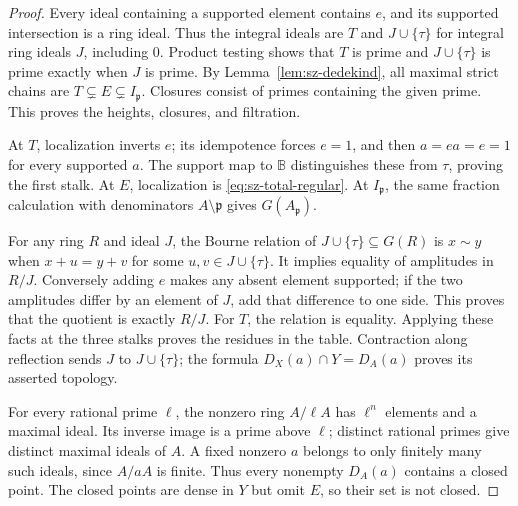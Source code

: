 \documentclass[11pt,a4paper]{article}
\theoremstyle{definition}\newtheorem{definition}[theorem]{Definition}
\begin{document}
\begin{proof}
Every ideal containing a supported element contains \(e\), and its
supported intersection is a ring ideal. Thus the integral ideals
are \(T\) and \(J\cup\{\tau\}\) for integral ring ideals \(J\), including
\(0\). Product testing shows that \(T\) is prime and
\(J\cup\{\tau\}\) is prime exactly when \(J\) is prime.
By Lemma~\ref{lem:sz-dedekind}, all maximal strict chains are
\(T\subsetneq E\subsetneq I_{\mathfrak p}\).
Closures consist of primes containing the given prime. This proves
the heights, closures, and filtration.

At \(T\), localization inverts \(e\); its idempotence forces \(e=1\),
and then \(a=ea=e=1\) for every supported \(a\). The support map to
\(\mathbb B\) distinguishes these from \(\tau\), proving the first
stalk. At \(E\), localization is \eqref{eq:sz-total-regular}.
At \(I_{\mathfrak p}\), the same fraction calculation with
denominators \(A\setminus\mathfrak p\) gives \(G(A_{\mathfrak p})\).

For any ring \(R\) and ideal \(J\), the Bourne relation of
\(J\cup\{\tau\}\subseteq G(R)\) is
\(x\sim y\) when \(x+u=y+v\) for some \(u,v\in J\cup\{\tau\}\).
It implies equality of amplitudes in \(R/J\).
Conversely adding \(e\) makes any absent element supported; if the
two amplitudes differ by an element of \(J\), add that difference
to one side. This proves that the quotient is exactly \(R/J\).
For \(T\), the relation is equality. Applying these facts at the
three stalks proves the residues in the table.
Contraction along reflection sends \(J\) to \(J\cup\{\tau\}\);
the formula \(D_X(a)\cap Y=D_A(a)\) proves its asserted topology.

For every rational prime \(\ell\), the nonzero ring \(A/\ell A\)
has \(\ell^n\) elements and a maximal ideal. Its inverse image is
a prime above \(\ell\); distinct rational primes give distinct
maximal ideals of \(A\). A fixed nonzero \(a\) belongs to only
finitely many such ideals, since \(A/aA\) is finite.
Thus every nonempty \(D_A(a)\) contains a closed point. The closed
points are dense in \(Y\) but omit \(E\), so their set is not closed.
\end{proof}
\end{document}
